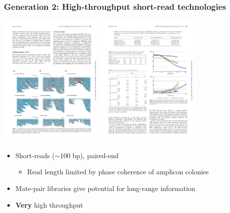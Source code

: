 \documentclass[serif,11pt]{beamer}
\begin{document}
\begin{frame}
\frametitle{Generation 2: High-throughput short-read technologies}
\label{sec-2-2}

   \includegraphics[width=2in]{img/short-reads-pileup.pdf}
   \includegraphics[width=2in]{img/illumina-error-rate-by-cycle.pdf}
\newline {\tiny [Nakamura et al.]}
\begin{itemize}
\item Short-reads ($\sim 100$ bp), paired-end
\begin{itemize}
\item Read length limited by phase coherence of amplicon colonies
\end{itemize}
\item Mate-pair libraries give potential for long-range information
\item \textbf{Very} high throughput
\end{itemize}
\end{frame}
\end{document}
